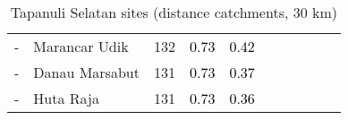 \begin{table}[ht]
\begin{tabular}{C{0.05\textwidth}C{0.15\textwidth}C{0.08\textwidth}C{0.08\textwidth}C{0.08\textwidth}C{0.08\textwidth}C{0.08\textwidth}C{0.08\textwidth}C{0.08\textwidth}C{0.08\textwidth}}
  {-} & Marancar Udik & 132 & \textcolor[HTML]{000000}{0.73} & \textcolor[HTML]{000000}{0.42} & \textcolor[HTML]{FFFFFF}{4} &  &  &  &  \\ 
  {-} & Danau Marsabut & 131 & \textcolor[HTML]{000000}{0.73} & \textcolor[HTML]{000000}{0.37} & \textcolor[HTML]{FFFFFF}{4} &  &  &  &  \\ 
  {-} & Huta Raja & 131 & \textcolor[HTML]{000000}{0.73} & \textcolor[HTML]{000000}{0.36} & \textcolor[HTML]{FFFFFF}{4} &  &  &  &  \\ 
  \end{tabular}
\endgroup
\caption{Tapanuli Selatan sites (distance catchments, 30 km)} 
\label{tab:tapanuli_selatan_dist}
\end{table}
